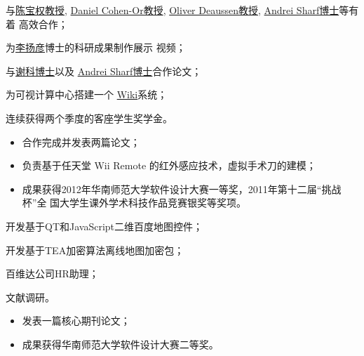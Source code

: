 \documentclass[11pt,a4paper,nolmodern]{moderncv}
\begin{document}

{
\begin{tightitemize}%
 \item 与\href{http://web.siat.ac.cn/~baoquan/}{陈宝权教授},
   \href{http://www.math.tau.ac.il/~dcor/}{Daniel Cohen-Or教授},
   \href{http://graphics.uni-konstanz.de/mitarbeiter/deussen.php}{Oliver
     Deaussen教授}, \href{http://www.idav.ucdavis.edu/~asharf/}{Andrei Sharf博士}等有着
   高效合作；
 \item 为\href{http://web.siat.ac.cn/~yangyan/}{李扬彦}博士的科研成果制作展示
   视频；
 \item 与\href{http://web.siat.ac.cn/~kexie}{谢科博士}以及
   \href{http://www.idav.ucdavis.edu/~asharf/}{Andrei Sharf博士}合作论文；
 \item 为可视计算中心搭建一个
   \href{http://vcc.siat.ac.cn/w/index.php/Main_Page}{Wiki}系统；
 \item 连续获得两个季度的客座学生奖学金。
 \end{tightitemize}}

%
  {
\begin{itemize}
 \item 合作完成并发表两篇论文；
 \item 负责基于任天堂 Wii Remote 的红外感应技术，虚拟手术刀的建模；
 \item 成果获得2012年华南师范大学软件设计大赛一等奖，2011年第十二届“挑战杯”全
   国大学生课外学术科技作品竞赛银奖等奖项。
\end{itemize}}

{
\begin{tightitemize}%
 \item 开发基于QT和JavaScript二维百度地图控件；
 \item 开发基于TEA加密算法离线地图加密包；
 \item 百维达公司HR助理；
 \item 文献调研。
 \end{tightitemize}}

%
  {
\begin{itemize}
 \item 发表一篇核心期刊论文；
 \item 成果获得华南师范大学软件设计大赛二等奖。
\end{itemize}}
\end{document}
